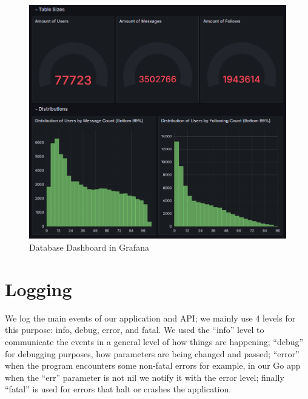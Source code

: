 \documentclass[12pt, a4paper, oneside]{book}
\begin{document}
\begin{figure}[H]
    \centering
    \includegraphics[width=0.8\linewidth]{images/database-dashboard.png}
    \caption{Database Dashboard in Grafana}
    \label{fig:db-dashboard}
\end{figure}





\section{Logging}

We log the main events of our application and API; we mainly use 4 levels for this purpose: info, debug, error, and fatal. We used the “info” level to communicate the events in a general level of how things are happening; “debug” for debugging purposes, how parameters are being changed and passed; “error” when the program encounters some non-fatal errors for example, in our Go app when the “err” parameter is not nil we notify it with the error level; finally “fatal” is used for errors that halt or crashes the application. \bigskip
\end{document}
